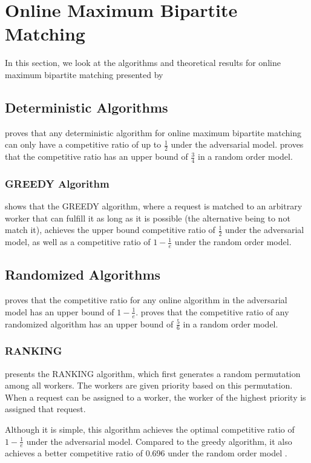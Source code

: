 \documentclass[urop]{socreport}
\begin{document}
\section{Online Maximum Bipartite Matching}
In this section, we look at the algorithms and theoretical results for online maximum bipartite matching presented by \cite{karp,goel}
\subsection{Deterministic Algorithms}
\cite{karp} proves that any deterministic algorithm for online maximum bipartite matching can only have a competitive ratio of up to $\frac{1}{2}$ under the adversarial model. \cite{goel} proves that the competitive ratio has an upper bound of $\frac{3}{4}$ in a random order model.

\subsubsection{GREEDY Algorithm}
\cite{karp} shows that the GREEDY algorithm, where a request is matched to an arbitrary worker that can fulfill it as long as it is possible (the alternative being to not match it), achieves the upper bound competitive ratio of $\frac{1}{2}$ under the adversarial model, as well as a competitive ratio of $1 - \frac{1}{e}$ under the random order model.

\subsection{Randomized Algorithms}
\cite{karp} proves that the competitive ratio for any online algorithm in the adversarial model has an upper bound of $1 - \frac{1}{e}$.
\cite{goel} proves that the competitive ratio of any randomized algorithm has an upper bound of $\frac{5}{6}$ in a random order model.
\subsubsection{RANKING}
\label{ranking}
\cite{karp} presents the RANKING algorithm, which first generates a random permutation among all workers. The workers are given priority based on this permutation. When a request can be assigned to a worker, the worker of the highest priority is assigned that request.

Although it is simple, this algorithm achieves the optimal competitive ratio of $1 - \frac{1}{e}$ under the adversarial model. Compared to the greedy algorithm, it also achieves a better competitive ratio of 0.696 under the random order model \cite{rankingrandomorder}.
\end{document}
